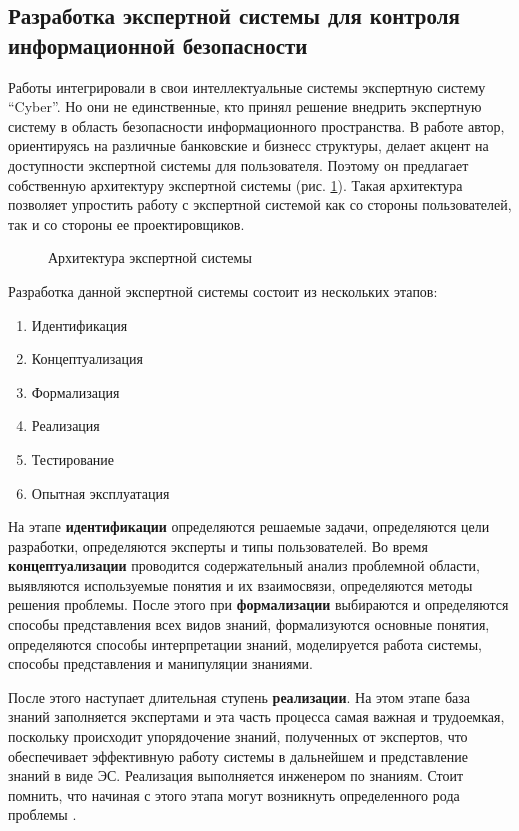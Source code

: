\subsection{Разработка экспертной системы для контроля информационной безопасности}
Работы \cite{scheme, ontoling} интегрировали в свои интеллектуальные системы экспертную систему ``Cyber''.
Но они не единственные, кто принял решение внедрить экспертную систему в область безопасности информационного
пространства. В работе \cite{idea} автор, ориентируясь на различные банковские и бизнесс структуры, делает акцент на
доступности экспертной системы для пользователя. Поэтому он предлагает собственную архитектуру экспертной системы
(рис. \ref{arch}). Такая архитектура позволяет упростить работу с экспертной системой как со стороны пользователей,
так и со стороны ее проектировщиков.

\begin{figure}[h]
    \caption{Архитектура экспертной системы \cite{idea}}
    \label{arch}
\end{figure}

Разработка данной экспертной системы состоит из нескольких этапов:
\begin{enumerate}
    \item
    Идентификация
    \item
    Концептуализация
    \item
    Формализация
    \item
    Реализация
    \item
    Тестирование
    \item
    Опытная эксплуатация
\end{enumerate}

На этапе \textbf{идентификации} определяются решаемые задачи, определяются цели разработки,
определяются эксперты и типы пользователей. Во время \textbf{концептуализации} проводится
содержательный анализ проблемной области, выявляются используемые понятия и их взаимосвязи,
определяются методы решения проблемы. После этого при \textbf{формализации}
выбираются и определяются способы представления всех видов знаний, формализуются основные
понятия, определяются способы интерпретации знаний, моделируется работа системы, способы
представления и манипуляции знаниями.

После этого наступает длительная ступень \textbf{реализации}. На этом этапе база знаний
заполняется экспертами и эта часть процесса самая важная и трудоемкая, поскольку происходит
упорядочение знаний, полученных от экспертов, что обеспечивает эффективную работу системы
в дальнейшем и представление знаний в виде ЭС. Реализация выполняется инженером по знаниям.
Стоит помнить, что начиная с этого этапа могут возникнуть определенного рода проблемы \cite{idea}.

